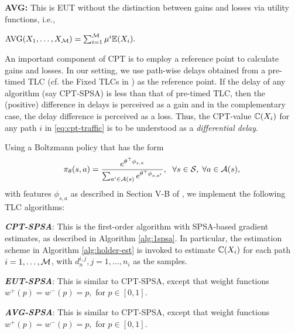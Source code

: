 \textbf{AVG:} This is EUT without the distinction between gains and losses via utility functions, i.e.,\\[1ex] 
\centerline{$\text{AVG}(X_1,\ldots,X_{\mathcal{M}}) = \sum_{i=1}^{\mathcal{M}} \mu^i \mathbb{E}(X_i).$} 

An important component of CPT is to employ a reference point to calculate gains and losses. 
In our setting, we use path-wise delays obtained from a pre-timed TLC (cf. the Fixed TLCs in \cite{prashanth2011reinforcement}) as the reference point. If the delay of any algorithm (say CPT-SPSA) is less than that of pre-timed TLC, then the (positive) difference in delays is perceived as a gain and in the complementary case, the delay difference is perceived as a loss. Thus, the CPT-value $\mathbb{C}(X_i)$ for any path $i$ in \eqref{eq:cpt-traffic} is to be understood as a \textit{differential delay}.  


Using a Boltzmann policy that has the form
$$
\pi_{\theta}(s,a) = \frac{e^{\theta^{\top} \phi_{s,a}}}{\sum_{a' \in {\mathcal{A}(s)}} e^{\theta^{\top} \phi_{s,a'}}},
\hspace{6pt} \forall s \in \mathcal{S},\;\forall a \in \mathcal{A}(s),
$$
with features $\phi_{s,a}$ as described in Section V-B of \cite{prashanth2012threshold},
we implement the following TLC algorithms:

{\bf\em CPT-SPSA}: This is the first-order algorithm with SPSA-based gradient estimates, as described in Algorithm \ref{alg:1spsa}. In particular, the estimation scheme in Algorithm \ref{alg:holder-est} is invoked to estimate $\mathbb{C}(X_i)$ for each path $i=1,\ldots,\mathcal{M}$, with $d_n^{i,j}, j=1,\ldots,n_i$ as the samples.

{\bf\em EUT-SPSA}: This is similar to CPT-SPSA, except that weight functions $w^+(p)=w^-(p)=p,$ for $p\in [0,1]$. 

{\bf\em AVG-SPSA}: This is similar to CPT-SPSA, except that weight functions $w^+(p)=w^-(p)=p,$ for $p\in [0,1]$. 

